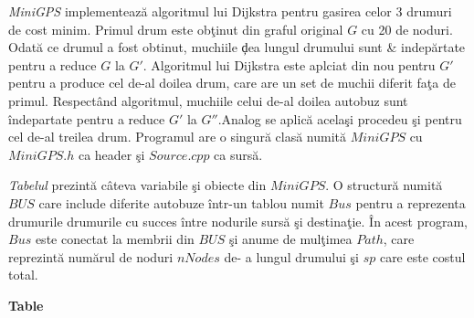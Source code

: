 \documentclass[11pt,a4paper]{report}
\begin{document}
     \textit{MiniGPS} implementeaz\u a algoritmul lui Dijkstra pentru gasirea celor 3 drumuri de cost minim. Primul drum este ob\c tinut din graful original $G$ cu 20 de noduri. Odat\u a ce drumul a fost obtinut, muchiile \c dea lungul drumului sunt \& indep\u artate pentru a reduce $G$ la $G'$. Algoritmul lui Dijkstra este aplciat din nou pentru $G'$ pentru a produce cel de-al doilea drum, care are un set de muchii diferit fa\c ta de primul. Respect\^ and algoritmul, muchiile celui de-al doilea autobuz sunt \^ indepartate pentru a reduce $G'$ la $G''$.Analog se aplic\u a acela\c si procedeu \c si pentru cel de-al treilea drum. 
     Programul are o singur\u a clas\u a numit\u a $MiniGPS$ cu $MiniGPS.h$ ca header \c si $Source.cpp$ ca surs\u a. 
      
      
      \textit{Tabelul} prezint\u a c\^ ateva variabile \c si obiecte din $MiniGPS$. O structur\u a numit\u a $BUS$ care include diferite autobuze \^ intr-un tablou numit $Bus$ pentru a reprezenta drumurile drumurile cu succes \^ intre nodurile surs\u a \c si destina\c tie. \^ In acest program, $Bus$ este conectat la membrii din $BUS$ \c si anume de mul\c timea $Path$, care reprezint\u a num\u arul de noduri $nNodes$ de- a lungul drumului \c si $sp$ care este costul total.
      
      \newpage
      \textbf{Table}
     
\end{document}
